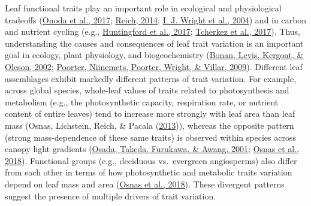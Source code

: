 \documentclass[
  12pt,
  letterpaper,
  DIV=11,
  numbers=noendperiod]{scrartcl}
\begin{document}
Leaf functional traits play an important role in ecological and
physiological tradeoffs (\protect\hyperlink{ref-Onoda2017}{Onoda et al.,
2017}; \protect\hyperlink{ref-Reich2014}{Reich, 2014};
\protect\hyperlink{ref-Wright2004a}{I. J. Wright et al., 2004}) and in
carbon and nutrient cycling (e.g.,
\protect\hyperlink{ref-Huntingford2017}{Huntingford et al., 2017};
\protect\hyperlink{ref-Tcherkez2017}{Tcherkez et al., 2017}). Thus,
understanding the causes and consequences of leaf trait variation is an
important goal in ecology, plant physiology, and biogeochemistry
(\protect\hyperlink{ref-Bonan2002}{Bonan, Levis, Kergoat, \& Oleson,
2002}; \protect\hyperlink{ref-Poorter2009}{Poorter, Niinemets, Poorter,
Wright, \& Villar, 2009}). Different leaf assemblages exhibit markedly
different patterns of trait variation. For example, across global
species, whole-leaf values of traits related to photosynthesis and
metabolism (e.g., the photosynthetic capacity, respiration rate, or
nutrient content of entire leaves) tend to increase more strongly with
leaf area than leaf mass (Osnas, Lichstein, Reich, \& Pacala
(\protect\hyperlink{ref-Osnas2013}{2013})), whereas the opposite pattern
(strong mass-dependence of these same traits) is observed within species
across canopy light gradients (\protect\hyperlink{ref-Osada2001}{Osada,
Takeda, Furukawa, \& Awang, 2001};
\protect\hyperlink{ref-Osnas2018}{Osnas et al., 2018}). Functional
groups (e.g., deciduous vs.~evergreen angiosperms) also differ from each
other in terms of how photosynthetic and metabolic traits variation
depend on leaf mass and area (\protect\hyperlink{ref-Osnas2018}{Osnas et
al., 2018}). These divergent patterns suggest the presence of multiple
drivers of trait variation.
\end{document}
